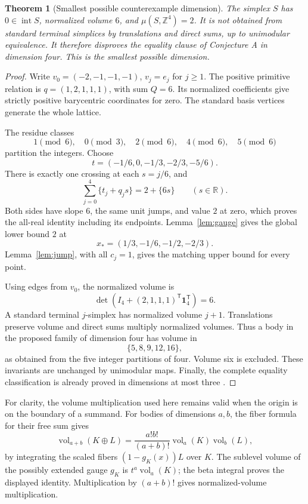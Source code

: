 \documentclass[11pt,a4paper]{article}
\newtheorem{theorem}{Theorem}[section]
\theoremstyle{remark}
\DeclareMathOperator{\vol}{vol}
\DeclareMathOperator{\inter}{int}
\newcommand{\R}{\mathbb R}\newcommand{\Z}{\mathbb Z}
\newcommand{\one}{\mathbf1}
\begin{document}
\begin{theorem}[Smallest possible counterexample dimension]\label{thm:S4}
The simplex $S$ has $0\in\inter S$, normalized volume $6$, and
$\mu(S,\Z^4)=2$. It is not obtained from standard terminal simplices
by translations and direct sums, up to unimodular equivalence.
It therefore disproves the equality clause of Conjecture A in
dimension four. This is the smallest possible dimension.
\end{theorem}
\begin{proof}
Write $v_0=(-2,-1,-1,-1)$, $v_j=e_j$ for $j\ge1$. The positive
primitive relation is $q=(1,2,1,1,1)$, with sum $Q=6$. Its normalized
coefficients give strictly positive barycentric coordinates for zero.
The standard basis vertices generate the whole lattice.

The residue classes
\[
 1\pmod6,\quad0\pmod3,\quad2\pmod6,\quad4\pmod6,\quad5\pmod6
\]
partition the integers. Choose
\[
 t=(-1/6,0,-1/3,-2/3,-5/6).
\]
There is exactly one crossing at each $s=j/6$, and
\begin{equation}\label{eq:S4cert}
 \sum_{j=0}^4\{t_j+q_js\}=2+\{6s\}\qquad(s\in\R).
\end{equation}
Both sides have slope $6$, the same unit jumps, and value $2$ at zero,
which proves the all-real identity including its endpoints.
Lemma~\ref{lem:gauge} gives the global lower bound $2$ at
\[
 x_*=(1/3,-1/6,-1/2,-2/3).
\]
Lemma~\ref{lem:jump}, with all $c_j=1$, gives the matching upper bound
for every point.

Using edges from $v_0$, the normalized volume is
\[
 \det(I_4+(2,1,1,1)^{\mathsf T}\one_4^{\mathsf T})=6.
\]
A standard terminal $j$-simplex has normalized volume $j+1$.
Translations preserve volume and direct sums multiply normalized
volumes. Thus a body in the proposed family of dimension four has
volume in
\[
 \{5,8,9,12,16\},
\]
as obtained from the five integer partitions of four. Volume six is
excluded. These invariants are unchanged by unimodular maps.
Finally, the complete equality classification is already proved
in dimensions at most three \cite[Theorem 1.3]{CSS}.
\end{proof}

For clarity, the volume multiplication used here remains valid when
the origin is on the boundary of a summand. For bodies of dimensions
$a,b$, the fiber formula for their free sum gives
\[
 \vol_{a+b}(K\oplus L)
 =\frac{a!b!}{(a+b)!}\vol_a(K)\vol_b(L),
\]
by integrating the scaled fibers $(1-g_K(x))L$ over $K$.
The sublevel volume of the possibly extended gauge $g_K$ is
$t^a\vol_a(K)$; the beta integral proves the displayed identity.
Multiplication by $(a+b)!$ gives normalized-volume multiplication.
\end{document}
